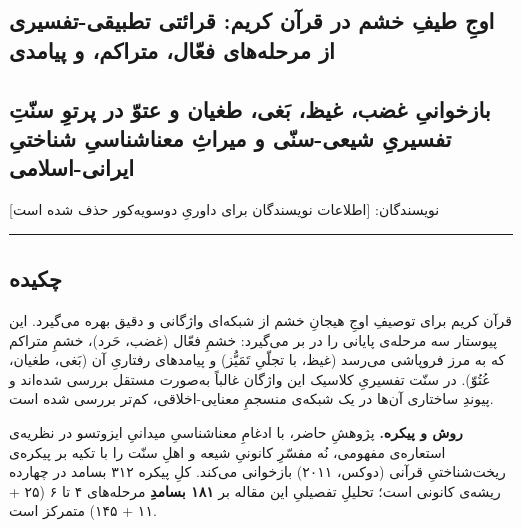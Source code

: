 \documentclass[12pt,a4paper]{article}
\begin{document}
\begin{RTL}
\begin{otherlanguage}{persian}

\section{اوجِ طیفِ خشم در قرآن کریم: قرائتی تطبیقی-تفسیری از مرحله‌های
فعّال، متراکم، و
پیامدی}\label{ux627ux648ux62c-ux637ux6ccux641-ux62eux634ux645-ux62fux631-ux642ux631ux622ux646-ux6a9ux631ux6ccux645-ux642ux631ux627ux626ux62aux6cc-ux62aux637ux628ux6ccux642ux6cc-ux62aux641ux633ux6ccux631ux6cc-ux627ux632-ux645ux631ux62dux644ux647ux647ux627ux6cc-ux641ux639ux627ux644-ux645ux62aux631ux627ux6a9ux645-ux648-ux67eux6ccux627ux645ux62fux6cc}

\subsection{بازخوانیِ غضب، غیظ، بَغی، طغیان و عتوّ در پرتوِ سنّتِ تفسیریِ
شیعی-سنّی و میراثِ معناشناسیِ شناختیِ
ایرانی-اسلامی}\label{ux628ux627ux632ux62eux648ux627ux646ux6cc-ux63aux636ux628-ux63aux6ccux638-ux628ux63aux6cc-ux637ux63aux6ccux627ux646-ux648-ux639ux62aux648-ux62fux631-ux67eux631ux62aux648-ux633ux646ux62a-ux62aux641ux633ux6ccux631ux6cc-ux634ux6ccux639ux6cc-ux633ux646ux6cc-ux648-ux645ux6ccux631ux627ux62b-ux645ux639ux646ux627ux634ux646ux627ux633ux6cc-ux634ux646ux627ux62eux62aux6cc-ux627ux6ccux631ux627ux646ux6cc-ux627ux633ux644ux627ux645ux6cc}

نویسندگان: {[}اطلاعات نویسندگان برای داوریِ دوسویه‌کور حذف شده است{]}

\begin{center}\rule{0.5\linewidth}{0.5pt}\end{center}

\subsection{چکیده}\label{ux686ux6a9ux6ccux62fux647}

قرآن کریم برای توصیفِ اوجِ هیجانِ خشم از شبکه‌ای واژگانی و دقیق بهره می‌گیرد.
این پیوستار سه مرحله‌ی پایانی را در بر می‌گیرد: خشمِ فعّال (غضب، حَرد)، خشمِ
متراکم که به مرز فروپاشی می‌رسد (غیظ، با تجلّیِ تَمَیُّز) و پیامدهای رفتاریِ آن
(بَغی، طغیان، عُتُوّ). در سنّت تفسیریِ کلاسیک این واژگان غالباً به‌صورت مستقل
بررسی شده‌اند و پیوندِ ساختاری آن‌ها در یک شبکه‌ی منسجمِ معنایی-اخلاقی، کم‌تر
بررسی شده است.

\textbf{روش و پیکره.} پژوهشِ حاضر، با ادغامِ معناشناسیِ میدانیِ ایزوتسو در
نظریه‌ی استعاره‌ی مفهومی، نُه مفسّرِ کانونیِ شیعه و اهلِ سنّت را با تکیه بر
پیکره‌ی ریخت‌شناختیِ قرآنی (دوکس، ۲۰۱۱) بازخوانی می‌کند. کلِ پیکره ۳۱۲ بسامد
در چهارده ریشه‌ی کانونی است؛ تحلیلِ تفصیلیِ این مقاله بر \textbf{۱۸۱ بسامدِ}
مرحله‌های ۴ تا ۶ (۲۵ + ۱۱ + ۱۴۵) متمرکز است.


\end{otherlanguage}
\end{RTL}
\end{document}
